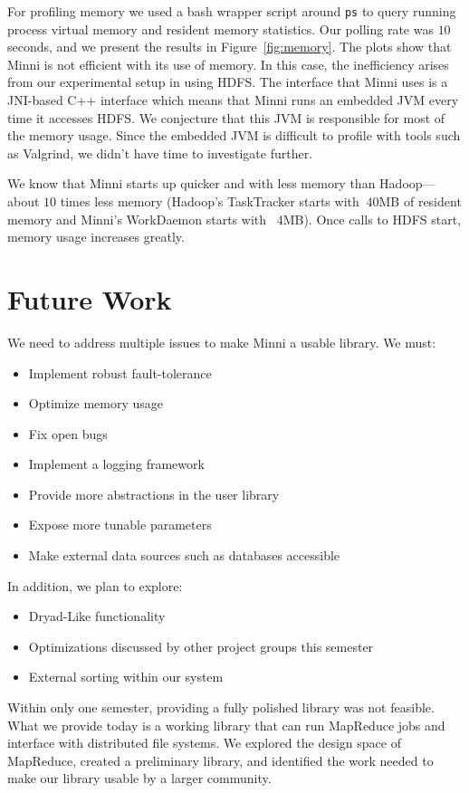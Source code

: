 \documentclass[10pt,letter,final,article,twocolumn]{article} %
\begin{document}
For profiling memory we used a bash wrapper script around {\tt ps} to query
running process virtual memory and resident memory statistics.  Our polling
rate was $10$ seconds, and we present the results in Figure~\ref{fig:memory}.
The plots show that Minni is not efficient with its use of memory.  In this case, the
inefficiency arises from our experimental setup in using HDFS.  The interface that
Minni uses is a JNI-based C++ interface which means that Minni runs an embedded
JVM every time it accesses HDFS.  We conjecture that this JVM is responsible for most of the memory usage.
Since the embedded JVM is difficult to profile with tools such as Valgrind, we didn't have time to investigate further.

We know that Minni starts up quicker and with less memory than Hadoop---about $10$ times less memory (Hadoop's
TaskTracker starts with $~40$MB of resident memory and Minni's WorkDaemon starts with ~$4$MB).  Once calls to HDFS start, memory
usage increases greatly.

\section{Future Work}
We need to address multiple issues to make Minni a usable library.  We must:
\begin{itemize}
\item Implement robust fault-tolerance
\item Optimize memory usage
\item Fix open bugs
\item Implement a logging framework
\item Provide more abstractions in the user library
\item Expose more tunable parameters
\item Make external data sources such as databases accessible
\end{itemize}

In addition, we plan to explore:
\begin{itemize}
\item Dryad-Like functionality
\item Optimizations discussed by other project groups this semester
\item External sorting within our system
\end{itemize}

Within only one semester, providing a fully polished library was not feasible.  What
we provide today is a working library that can run MapReduce jobs and interface with
distributed file systems.  We explored the design space of MapReduce, created a preliminary
library, and identified the work needed to make our library usable by a larger community.
\end{document}
